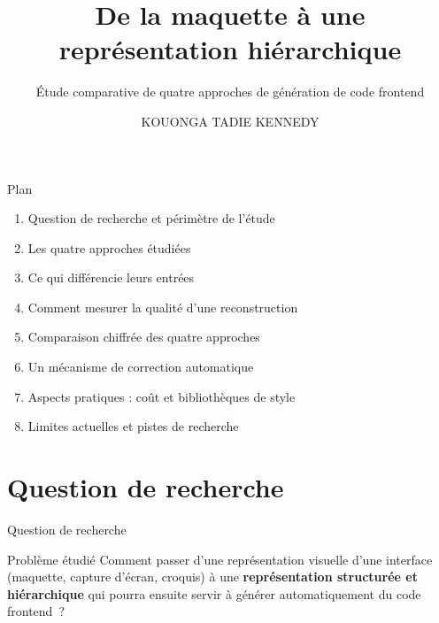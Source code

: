 \documentclass[11pt]{beamer}
\title{De la maquette à une représentation hiérarchique}
\subtitle{Étude comparative de quatre approches de génération de code frontend}
\author{KOUONGA TADIE KENNEDY}
\institute{Université de Douala}
\date{}
\begin{document}
\begin{frame}
\titlepage
\end{frame}

\begin{frame}{Plan}
\begin{enumerate}
\item Question de recherche et périmètre de l'étude
\item Les quatre approches étudiées
\item Ce qui différencie leurs entrées
\item Comment mesurer la qualité d'une reconstruction
\item Comparaison chiffrée des quatre approches
\item Un mécanisme de correction automatique
\item Aspects pratiques : coût et bibliothèques de style
\item Limites actuelles et pistes de recherche
\end{enumerate}
\end{frame}

\section{Question de recherche}

\begin{frame}{Question de recherche}
\begin{block}{Problème étudié}
Comment passer d'une représentation visuelle d'une interface (maquette, capture d'écran, croquis) à une \textbf{représentation structurée et hiérarchique} qui pourra ensuite servir à générer automatiquement du code frontend~?
\end{block}
\begin{center}
\end{center}
\end{frame}
\end{document}
